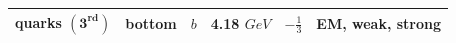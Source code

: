 \begin{table}[!h!tb]
\begin{center}
\begin{tabular}{|l|c|c|c|c|c|}
			quarks $(\mathbf{3^{rd}})$& bottom &  $b$ & 4.18 $GeV$  & $-\frac{1}{3}$ & EM, weak, strong \\
                        \hline \hline
                \end{tabular}
                \normalsize
        \end{center}
\end{table}


